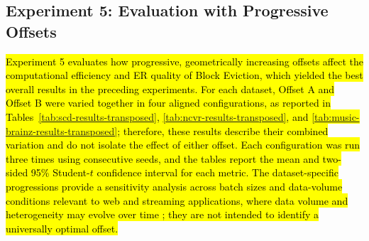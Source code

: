 \documentclass{ieeeaccess}
\begin{document}
\begin{table}[!t]
\centering
\caption{\hl{Mean residence time for each dataset and eviction policy.}}
\label{tab:comparacao_memoria_consolidada}
\scriptsize
\setlength{\tabcolsep}{3pt}
\renewcommand{\arraystretch}{0.95}
\end{table}


\subsection{Experiment 5: Evaluation with Progressive Offsets}

\hl{Experiment 5 evaluates how progressive, geometrically increasing offsets affect the computational efficiency and ER quality of Block Eviction, which yielded the best overall results in the preceding experiments. For each dataset, Offset A and Offset B were varied together in four aligned configurations, as reported in Tables~\ref{tab:scd-results-transposed}, \ref{tab:ncvr-results-transposed}, and \ref{tab:music-brainz-results-transposed}; therefore, these results describe their combined variation and do not isolate the effect of either offset. Each configuration was run three times using consecutive seeds, and the tables report the mean and two-sided 95\% Student-$t$ confidence interval for each metric. The dataset-specific progressions provide a sensitivity analysis across batch sizes and data-volume conditions relevant to web and streaming applications, where data volume and heterogeneity may evolve over time \cite{ren2021online,hassani2019overview}; they are not intended to identify a universally optimal offset.}
\end{document}
